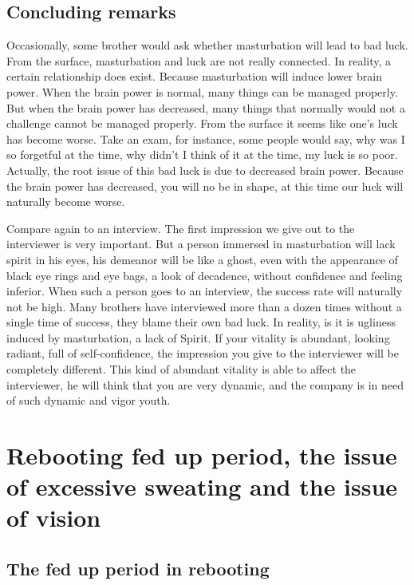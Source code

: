 \documentclass[
]{book}
\begin{document}
\hypertarget{concluding-remarks-3}{%
\section{Concluding remarks}\label{concluding-remarks-3}}

Occasionally, some brother would ask whether masturbation will lead to bad luck. From the surface, masturbation and luck are not really connected. In reality, a certain relationship does exist. Because masturbation will induce lower brain power. When the brain power is normal, many things can be managed properly. But when the brain power has decreased, many things that normally would not a challenge cannot be managed properly. From the surface it seems like one's luck has become worse. Take an exam, for instance, some people would say, why was I so forgetful at the time, why didn't I think of it at the time, my luck is so poor. Actually, the root issue of this bad luck is due to decreased brain power. Because the brain power has decreased, you will no be in shape, at this time our luck will naturally become worse.

Compare again to an interview. The first impression we give out to the interviewer is very important. But a person immersed in masturbation will lack spirit in his eyes, his demeanor will be like a ghost, even with the appearance of black eye rings and eye bags, a look of decadence, without confidence and feeling inferior. When such a person goes to an interview, the success rate will naturally not be high. Many brothers have interviewed more than a dozen times without a single time of success, they blame their own bad luck. In reality, is it is ugliness induced by masturbation, a lack of Spirit. If your vitality is abundant, looking radiant, full of self-confidence, the impression you give to the interviewer will be completely different. This kind of abundant vitality is able to affect the interviewer, he will think that you are very dynamic, and the company is in need of such dynamic and vigor youth.

\hypertarget{rebooting-fed-up-period-the-issue-of-excessive-sweating-and-the-issue-of-vision}{%
\chapter{Rebooting fed up period, the issue of excessive sweating and the issue of vision}\label{rebooting-fed-up-period-the-issue-of-excessive-sweating-and-the-issue-of-vision}}

\hypertarget{the-fed-up-period-in-rebooting}{%
\section{The fed up period in rebooting}\label{the-fed-up-period-in-rebooting}}
\end{document}

